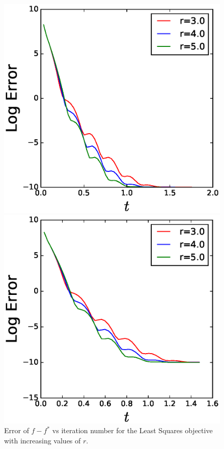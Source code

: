 \begin{figure}[!htb]
  \includegraphics[width=1\linewidth]{SourceFiles/plots/least_squares_errors_compare.eps}
\caption{Error of $f-f^*$ vs iteration number for the Least Squares objective with increasing values of $r$.}
\label{fig: Rerrors1}
\endminipage\hfill
{}
  \includegraphics[width=1\linewidth]{SourceFiles/plots/lasso_fat_design_errors_compare.eps}

\end{figure}
